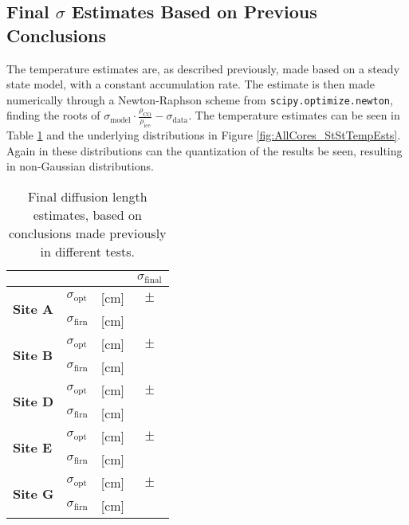 \documentclass[../../CompleteThesis2/Complete_2ndDraft]{subfiles}
\begin{document}
\subsection[Final $\sigma$ Estimates]{Final $\sigma$ Estimates Based on Previous Conclusions}
\label{Subsec:Results_DiffLenEst_AlphabetCores_FinalEstimates}
The temperature estimates are, as described previously, made based on a steady state model, with a constant accumulation rate. The estimate is then made numerically through a Newton-Raphson scheme from \lstinline[language=Python]|scipy.optimize.newton|, finding the roots of $\sigma_{\text{model}}\cdot \frac{\rho_{\text{CO}}}{\rho_{\text{ice}}} - \sigma_{\text{data}}$.
The temperature estimates can be seen in Table \ref{Tab:TempEstStSt} and the underlying distributions in Figure \ref{fig:AllCores_StStTempEsts}. Again in these distributions can the quantization of the results be seen, resulting in non-Gaussian distributions.
\begin{table}[ht]
	\centering
	\begin{tabular}{l l l | c }
		& & & $\sigma_{\text{final}}$\\
		\hline
		\hline 
		\multirow{2}{*}{\textbf{Site A}} & $\sigma_{\text{opt}}$ & [cm] & $ \pm$ \\
		& $\sigma_{\text{firn}}$ & [cm] & \\
		\hline
		
		\multirow{2}{*}{\textbf{Site B}} & $\sigma_{\text{opt}}$ & [cm] & $ \pm $ \\
		& $\sigma_{\text{firn}}$ & [cm] & \\
		\hline
		
		\multirow{2}{*}{\textbf{Site D}} & $\sigma_{\text{opt}}$ & [cm] & $ \pm $ \\
		& $\sigma_{\text{firn}}$ & [cm] & \\
		\hline
		
		\multirow{2}{*}{\textbf{Site E}} & $\sigma_{\text{opt}}$ & [cm] & $ \pm $ \\
		& $\sigma_{\text{firn}}$ & [cm] & \\
		\hline
		
		\multirow{2}{*}{\textbf{Site G}} & $\sigma_{\text{opt}}$ & [cm] & $ \pm $ \\
		& $\sigma_{\text{firn}}$ & [cm] & \\
		
		\hline
	\end{tabular}
\caption[Final $\sigma$ Estimates]{\small Final diffusion length estimates, based on conclusions made previously in different tests.}
\label{Tab:TempEstStSt}
\end{table}
\end{document}
